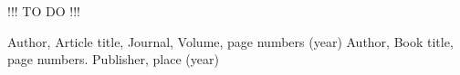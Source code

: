 \smallskip
{\color{red} !!! TO DO !!!}
\smallskip



\begin{thebibliography}{}
%
%
Author, Article title, Journal, Volume, page numbers (year)
Author, Book title, page numbers. Publisher, place (year)
\end{thebibliography}



